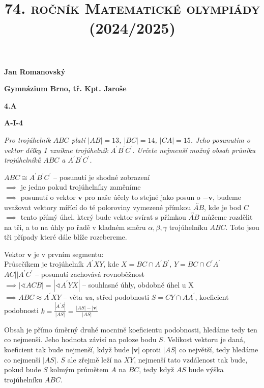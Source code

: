 \documentclass{article}
\title{\normalsize{\vspace{-2cm}\textsc{74. ročník Matematické olympiády (2024/2025)}\vspace{-1.7cm}}}
\date{}
\author{}
\begin{document}
\maketitle

\textbf{ }

\noindent \textbf{Jan Romanovský}

\noindent \textbf{Gymnázium Brno, tř. Kpt. Jaroše}

\noindent \textbf{4.A}

\noindent \textbf{A-\textrm{I}-4}

\textbf{ }

\textit{Pro trojúhelník $ABC$ platí $|AB| = 13$, $|BC| = 14$, $|CA| = 15$. Jeho posunutím o vektor délky 1 vznikne trojúhelník $A^\prime B^\prime C^\prime$. Určete nejmenší možný obsah průniku trojúhelníků $ABC$ a $A^\prime B^\prime C^\prime$.}

\textbf{ }

$ABC \cong A^\prime B^\prime C^\prime$ -- posunutí je shodné zobrazení\\
$\implies$ je jedno pokud trojúhelníky zaměníme\\
$\implies$ posunutí o vektor $\mathbf{v}$ pro naše účely to stejné jako posun o $\mathbf{-v}$, budeme uvažovat vektory mířící do té poloroviny vymezené přímkou $\overleftrightarrow{AB}$, kde je bod $C$\\
$\implies$ tento přímý úhel, který bude vektor svírat s přímkou $\overleftrightarrow{AB}$ můžeme rozdělit na tři, a to na úhly po řadě v kladném směru $\alpha, \beta, \gamma$ trojúhelníku $ABC$. Toto jsou tři případy které dále blíže rozebereme.

\textbf{ }

Vektor $\mathbf{v}$ je v prvním segmentu:\\
Průsečíkem je trojúhelník $A^\prime XY$, kde $X = BC \cap A^\prime B^\prime$, $Y = BC \cap C^\prime A^\prime$\\
$AC || A^\prime C^\prime$ -- posunutí zachovává rovnoběžnost\\
$\implies | \sphericalangle ACB| = | \sphericalangle A^\prime YX|$ -- souhlasné úhly, obdobně úhel u X\\
$\implies ABC \approx A^\prime XY$ -- věta \textit{uu}, střed podobnosti $S = CY \cap AA^\prime$, koeficient podobnosti $k = \frac{|A^\prime S|}{|AS|} = \frac{|AS|-|\textbf{v}|}{|AS|}$

\textbf{ }

Obsah je přímo úměrný druhé mocnině koeficientu podobnosti, hledáme tedy ten co nejmenší. Jeho hodnota závisí na poloze bodu $S$. Velikost vektoru je daná, koeficient tak bude nejmenší, když bude $|\textbf{v}|$ oproti $|AS|$ co největší, tedy hledáme co nejmenší $|AS|$. $S$ ale zřejmě leží na $XY$, nejmenší tato vzdálenost tak bude, pokud bude $S$ kolmým průmětem $A$ na $BC$, tedy když $AS$ bude výška trojúhelníku $ABC$.
\end{document}
